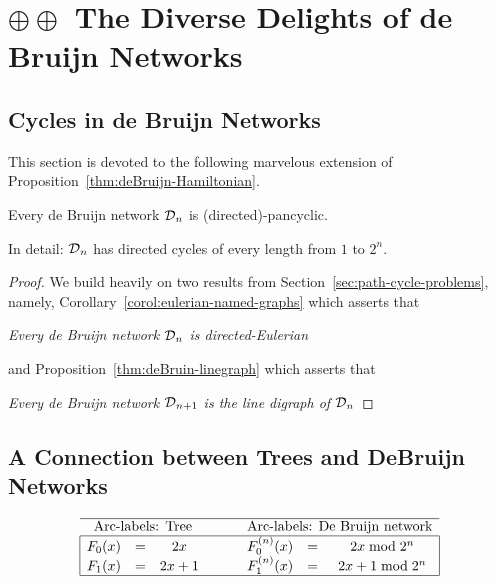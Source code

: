 \chapter{$\oplus \oplus$ The Diverse Delights of de Bruijn Networks}
\label{ch:de-Bruijn-delights}



\section{Cycles in de Bruijn Networks}
\label{Appendix:deBruijn-Pancyclic}

This section is devoted to the following marvelous extension of
Proposition~\ref{thm:deBruijn-Hamiltonian}.

\begin{prop}
\label{thm:deBruijn-pancyclic}
Every de Bruijn network $\mbox{$\cal D$}_n$ is (directed)-pancyclic.

In detail:  $\mbox{$\cal D$}_n$ has directed cycles of every length from $1$ to $2^n$.
\end{prop}

\begin{proof}
We build heavily on two results from Section~\ref{sec:path-cycle-problems}, namely,
Corollary~\ref{corol:eulerian-named-graphs} which asserts that

{\em Every de Bruijn network $\mbox{$\cal D$}_n$ is directed-Eulerian}

\noindent
and Proposition~\ref{thm:deBruin-linegraph} which asserts that

{\em Every de Bruijn network $\mbox{$\cal D$}_{n+1}$ is the line digraph of $\mbox{$\cal D$}_n$}






\end{proof}


\section{A Connection between Trees and DeBruijn Networks} 
\label{Appendix:tree-DB}

\[
\begin{array}{|ccccccc|}
\hline
\multicolumn{3}{c}{\mbox{Arc-labels: Tree}} & \hspace*{.2in}& \multicolumn{3}{c}{\mbox{Arc-labels: De Bruijn network}} \\
\hline 
F_0(x) & = & 2x      &  &  F^{(n)}_0(x) & = & 2x \bmod 2^n \\
F_1(x) & = & 2x+1  &  &  F^{(n)}_1(x) & = & 2x +1 \bmod 2^n \\ 
\hline
\end{array}
\]

